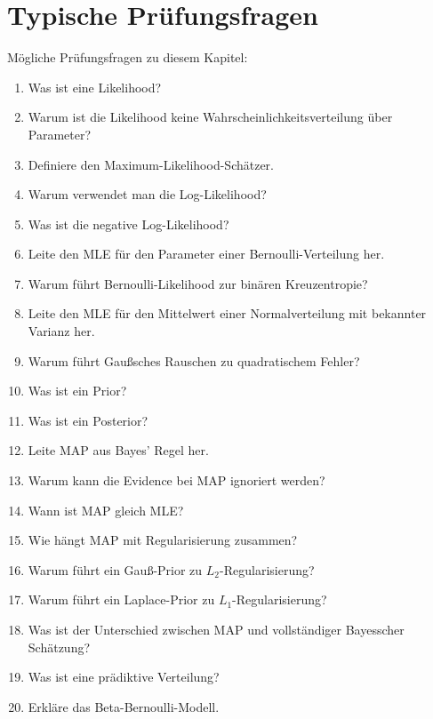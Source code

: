 \section{Typische Prüfungsfragen}

\begin{examtipbox}
Mögliche Prüfungsfragen zu diesem Kapitel:

\begin{enumerate}
    \item Was ist eine Likelihood?
    \item Warum ist die Likelihood keine Wahrscheinlichkeitsverteilung über Parameter?
    \item Definiere den Maximum-Likelihood-Schätzer.
    \item Warum verwendet man die Log-Likelihood?
    \item Was ist die negative Log-Likelihood?
    \item Leite den MLE für den Parameter einer Bernoulli-Verteilung her.
    \item Warum führt Bernoulli-Likelihood zur binären Kreuzentropie?
    \item Leite den MLE für den Mittelwert einer Normalverteilung mit bekannter Varianz her.
    \item Warum führt Gaußsches Rauschen zu quadratischem Fehler?
    \item Was ist ein Prior?
    \item Was ist ein Posterior?
    \item Leite MAP aus Bayes' Regel her.
    \item Warum kann die Evidence bei MAP ignoriert werden?
    \item Wann ist MAP gleich MLE?
    \item Wie hängt MAP mit Regularisierung zusammen?
    \item Warum führt ein Gauß-Prior zu \(L_2\)-Regularisierung?
    \item Warum führt ein Laplace-Prior zu \(L_1\)-Regularisierung?
    \item Was ist der Unterschied zwischen MAP und vollständiger Bayesscher Schätzung?
    \item Was ist eine prädiktive Verteilung?
    \item Erkläre das Beta-Bernoulli-Modell.
\end{enumerate}
\end{examtipbox}